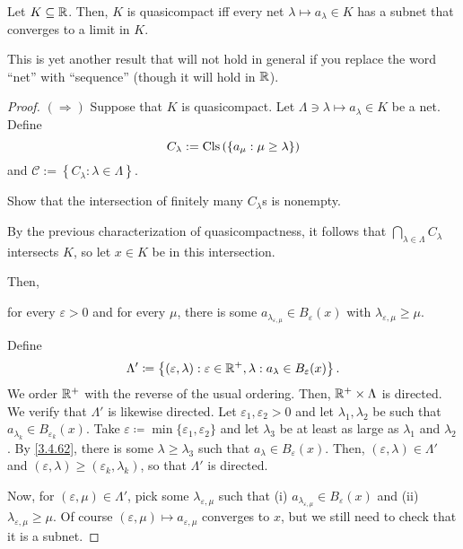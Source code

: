 \begin{thm}\label{prp3.4.56}
Let $K\subseteq \mathbb{R}$.  Then, $K$ is quasicompact iff every net $\lambda \mapsto a_\lambda \in K$ has a subnet that converges to a limit in $K$.
\begin{rmk}
This is yet another result that will not hold in general if you replace the word ``net'' with ``sequence'' (though it will hold in $\mathbb{R}$).
\end{rmk}
\begin{proof}
$(\Rightarrow )$ Suppose that $K$ is quasicompact.  Let $\Lambda \ni \lambda \mapsto a_\lambda \in K$ be a net.  Define
\begin{equation}
C_\lambda :=\operatorname{Cls} \left( \left\{ a_\mu :\mu \geq \lambda \right\} \right) 
\end{equation}
and $\mathcal{C}:=\left\{ C_\lambda :\lambda \in \Lambda \right\}$.
\begin{exr}
Show that the intersection of finitely many $C_\lambda$s is nonempty.
\end{exr}
By the previous characterization of quasicompactness, it follows that $\bigcap _{\lambda \in \Lambda}C_\lambda$ intersects $K$, so let $x\in K$ be in this intersection.

Then,
\begin{textequation}[3.4.62]
for every $\varepsilon >0$ and for every $\mu$, there is some $a_{\lambda _{\varepsilon ,\mu}}\in B_\varepsilon (x)$ with $\lambda _{\varepsilon ,\mu}\geq \mu$.
\end{textequation}
Define
\begin{equation}
\Lambda '\coloneqq \left\{ (\varepsilon ,\lambda ):\varepsilon \in \mathbb{R} ^+,\lambda :a_\lambda \in B_{\varepsilon}(x)\right\} .
\end{equation}
We order $\mathbb{R} ^+$ with the reverse of the usual ordering.  Then, $\mathbb{R} ^+\times \Lambda$ is directed.  We verify that $\Lambda '$ is likewise directed.  Let $\varepsilon _1,\varepsilon _2>0$ and let $\lambda _1,\lambda _2$ be such that $a_{\lambda _k}\in B_{\varepsilon _k}(x)$.  Take $\varepsilon \coloneqq \min \{ \varepsilon _1,\varepsilon _2\}$ and let $\lambda _3$ be at least as large as $\lambda _1$ and $\lambda _2$.  By \eqref{3.4.62}, there is some $\lambda \geq \lambda _3$ such that $a_\lambda \in B_\varepsilon (x)$.  Then, $(\varepsilon ,\lambda )\in \Lambda '$ and $(\varepsilon ,\lambda )\geq (\varepsilon _k,\lambda _k)$, so that $\Lambda '$ is directed.

Now, for $(\varepsilon ,\mu )\in \Lambda '$, pick some $\lambda _{\varepsilon ,\mu}$ such that (i) $a_{\lambda _{\varepsilon ,\mu}}\in B_\varepsilon (x)$ and (ii) $\lambda _{\varepsilon ,\mu}\geq \mu$.  Of course $(\varepsilon ,\mu )\mapsto a_{\varepsilon ,\mu}$ converges to $x$, but we still need to check that it is a subnet.


\end{proof}
\end{thm}
